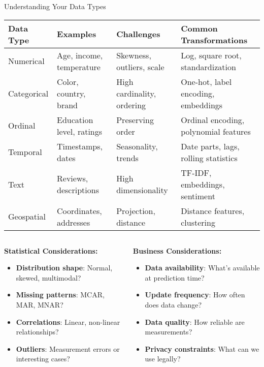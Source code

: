 \documentclass[aspectratio=169,11pt]{beamer}
\begin{document}
\begin{frame}{Understanding Your Data Types}
\begin{table}
\centering
\small
\begin{tabular}{p{2cm}p{3cm}p{3cm}p{3.5cm}}
\toprule
\textbf{Data Type} & \textbf{Examples} & \textbf{Challenges} & \textbf{Common Transformations} \\
\midrule
Numerical & Age, income, temperature & Skewness, outliers, scale & Log, square root, standardization \\
\midrule
Categorical & Color, country, brand & High cardinality, ordering & One-hot, label encoding, embeddings \\
\midrule
Ordinal & Education level, ratings & Preserving order & Ordinal encoding, polynomial features \\
\midrule
Temporal & Timestamps, dates & Seasonality, trends & Date parts, lags, rolling statistics \\
\midrule
Text & Reviews, descriptions & High dimensionality & TF-IDF, embeddings, sentiment \\
\midrule
Geospatial & Coordinates, addresses & Projection, distance & Distance features, clustering \\
\bottomrule
\end{tabular}
\end{table}

\begin{columns}
\begin{column}{0.5\textwidth}
\textbf{Statistical Considerations:}
\begin{itemize}
\item \textbf{Distribution shape}: Normal, skewed, multimodal?
\item \textbf{Missing patterns}: MCAR, MAR, MNAR?
\item \textbf{Correlations}: Linear, non-linear relationships?
\item \textbf{Outliers}: Measurement errors or interesting cases?
\end{itemize}
\end{column}
\begin{column}{0.5\textwidth}
\textbf{Business Considerations:}
\begin{itemize}
\item \textbf{Data availability}: What's available at prediction time?
\item \textbf{Update frequency}: How often does data change?
\item \textbf{Data quality}: How reliable are measurements?
\item \textbf{Privacy constraints}: What can we use legally?
\end{itemize}
\end{column}
\end{columns}
\end{frame}
\end{document}
